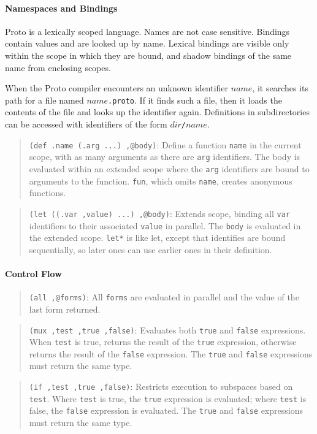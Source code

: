 \documentclass{article}
\newcommand\function[2]
{\begin{quote}{\tt #1}: #2 \end{quote}}
\newcommand\var[1]{{\tt #1}}
\begin{document}
\paragraph{Namespaces and Bindings}

Proto is a lexically scoped language.  Names are not case sensitive.
Bindings contain values and are looked up by name.  Lexical bindings
are visible only within the scope in which they are bound, and shadow
bindings of the same name from enclosing scopes.

When the Proto compiler encounters an unknown identifier $name$, it
searches its path for a file named {\tt $name$.proto}.  If it finds
such a file, then it loads the contents of the file and looks up the
identifier again.  Definitions in subdirectories can be accessed with
identifiers of the form {\tt $dir$/$name$}.

\function{(def .name (.arg ...) ,@body)}{Define a function \var{name}
  in the current scope, with as many arguments as there are \var{arg}
  identifiers.  The body is evaluated within an extended scope where
  the \var{arg} identifiers are bound to arguments to the function.
  \var{fun}, which omits \var{name}, creates anonymous functions.}

\function{(let ((.var ,value) ...) ,@body)}{Extends scope,
  binding all \var{var} identifiers to their associated \var{value} 
  in parallel.  The \var{body} is evaluated in the extended scope.
  \var{let*} is like let, except that identifies are bound sequentially,
  so later ones can use earlier ones in their definition.}

\paragraph{Control Flow}

\function{(all ,@forms)}{All \var{forms} are evaluated in parallel
  and the value of the last form returned.}

\function{(mux ,test ,true ,false)}{Evaluates both
  \var{true} and \var{false} expressions.  When \var{test} is true,
  returns the result of the \var{true} expression, otherwise returns
  the result of the \var{false} expression.  The \var{true} and
  \var{false} expressions must return the same type.}

\function{(if ,test ,true ,false)}{Restricts execution to
  subspaces based on \var{test}.  Where \var{test} is true, the
  \var{true} expression is evaluated; where \var{test} is false, the
  \var{false} expression is evaluated.  The \var{true} and \var{false}
  expressions must return the same type.}
\end{document}
